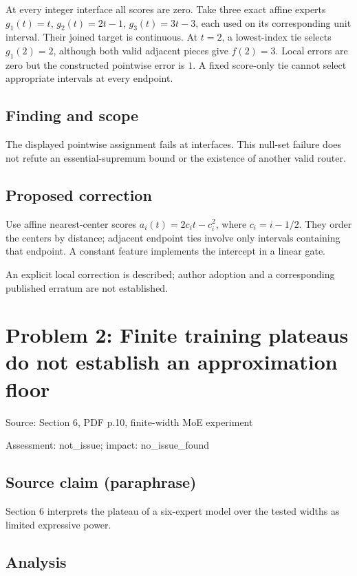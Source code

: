 \documentclass[11pt]{article}
\begin{document}
At every integer interface all scores are zero. Take three exact affine experts \(g_1(t)=t\), \(g_2(t)=2t-1\), \(g_3(t)=3t-3\), each used on its corresponding unit interval. Their joined target is continuous. At \(t=2\), a lowest-index tie selects \(g_1(2)=2\), although both valid adjacent pieces give \(f(2)=3\). Local errors are zero but the constructed pointwise error is \(1\). A fixed score-only tie cannot select appropriate intervals at every endpoint.

\subsection*{Finding and scope}

The displayed pointwise assignment fails at interfaces. This null-set failure does not refute an essential-supremum bound or the existence of another valid router.

\subsection*{Proposed correction}

Use affine nearest-center scores \(a_i(t)=2c_it-c_i^2\), where \(c_i=i-1/2\). They order the centers by distance; adjacent endpoint ties involve only intervals containing that endpoint. A constant feature implements the intercept in a linear gate.

An explicit local correction is described; author adoption and a corresponding published erratum are not established.

\section*{Problem 2: Finite training plateaus do not establish an approximation floor}

Source: Section 6, PDF p.10, finite-width MoE experiment

Assessment: not\_issue; impact: no\_issue\_found

\subsection*{Source claim (paraphrase)}

Section 6 interprets the plateau of a six-expert model over the tested widths as limited expressive power.

\subsection*{Analysis}
\end{document}
